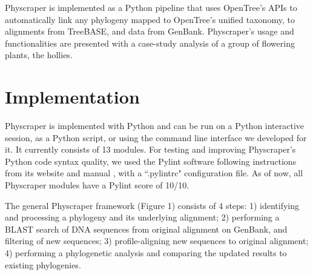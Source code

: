 \documentclass{bmcart}
\begin{document}
Physcraper is implemented as a Python pipeline that uses OpenTree's APIs to automatically
link any phylogeny mapped to OpenTree's unified taxonomy,
to alignments from TreeBASE, and data from GenBank.
Physcraper's usage and functionalities are presented with a case-study analysis of a
group of flowering plants, the hollies.


\section*{Implementation}

Physcraper is implemented with Python and can be run on a Python interactive session,
as a Python script, or using the command line interface we developed for it.
It currently consists of 13 modules.
For testing and improving Physcraper's Python code syntax quality, we
used the Pylint software following instructions from its website \cite{pylintWeb}
 and manual \cite{pylintManual}, with a ``.pylintrc" configuration file.
As of now, all Physcraper modules have a Pylint score of 10/10.


The general Physcraper framework (Figure 1) consists of 4 steps: 1) identifying and
processing a phylogeny and its underlying alignment; 2) performing a BLAST search of
DNA sequences from original alignment on GenBank, and filtering of new sequences;
3) profile-aligning new sequences to original alignment; 4) performing a phylogenetic
analysis and comparing the updated results to existing phylogenies.
\end{document}
